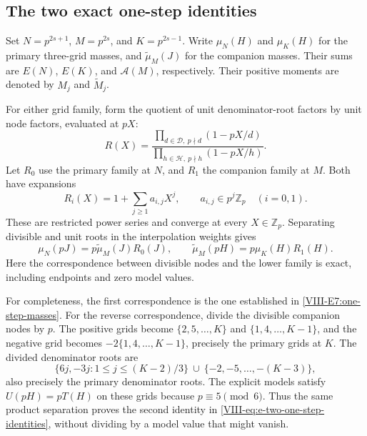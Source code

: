 \documentclass[11pt,letterpaper]{article}
\numberwithin{equation}{section}
\begin{document}
\subsection{The two exact one-step identities}
Set $N=p^{2s+1}$, $M=p^{2s}$, and $K=p^{2s-1}$.
Write $\mu_N(H)$ and $\mu_K(H)$ for the primary three-grid masses,
and $\widetilde\mu_M(J)$ for the companion masses. Their sums are
$E(N)$, $E(K)$, and $\mathcal A(M)$, respectively. Their positive
moments are denoted by $M_j$ and $\widetilde M_j$.

For either grid family, form the quotient of unit denominator-root
factors by unit node factors, evaluated at $pX$:
\[
 R(X)=
 \frac{\prod_{d\in\mathcal D,\ p\nmid d}(1-pX/d)}
      {\prod_{h\in\mathcal H,\ p\nmid h}(1-pX/h)}.
\]
Let $R_0$ use the primary family at $N$, and $R_1$ the companion
family at $M$. Both have expansions
\begin{equation}\label{VIII-eq:e-kernel-coefficient-bound}
 R_i(X)=1+\sum_{j\ge1}a_{i,j}X^j,
 \qquad a_{i,j}\in p^j\mathbb Z_p\quad(i=0,1).
\end{equation}
These are restricted power series and converge at every $X\in\mathbb Z_p$.
Separating divisible and unit roots in the interpolation weights gives
\begin{equation}\label{VIII-eq:e-two-one-step-identities}
 \mu_N(pJ)=p\widetilde\mu_M(J)R_0(J),\qquad
 \widetilde\mu_M(pH)=p\mu_K(H)R_1(H).
\end{equation}
Here the correspondence between divisible nodes and the lower family
is exact, including endpoints and zero model values.

For completeness, the first correspondence is the one established in
\eqref{VIII-E7:one-step-masses}. For the reverse correspondence, divide the
divisible companion nodes by $p$. The positive grids become
$\{2,5,\ldots,K\}$ and $\{1,4,\ldots,K-1\}$, and the negative grid
becomes $-2\{1,4,\ldots,K-1\}$, precisely the primary grids at $K$.
The divided denominator roots are
\[
 \{6j,-3j:1\le j\le(K-2)/3\}
 \ \cup\ \{-2,-5,\ldots,-(K-3)\},
\]
also precisely the primary denominator roots. The explicit models
satisfy $U(pH)=pT(H)$ on these grids because $p\equiv5\pmod6$.
Thus the same product separation proves the second identity in
\eqref{VIII-eq:e-two-one-step-identities}, without dividing by a model
value that might vanish.
\end{document}

